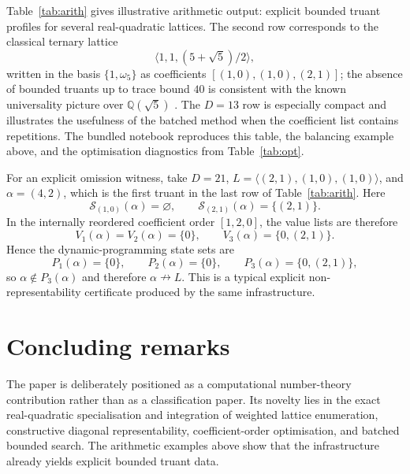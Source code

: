 \documentclass[manuscript]{acmart}
\theoremstyle{plain}
\theoremstyle{definition}
\theoremstyle{nonitalicremark}
\newcommand{\Q}{\mathbb{Q}}
\newcommand{\cS}{\mathcal{S}}
\begin{document}
Table~\ref{tab:arith} gives illustrative arithmetic output: explicit bounded truant
profiles for several real-quadratic lattices. The second row corresponds to the classical ternary
lattice
\[
\langle 1,1,(5+\sqrt5)/2\rangle,
\]
written in the basis $\{1,\omega_5\}$ as coefficients $[(1,0),(1,0),(2,1)]$; the absence of bounded
truants up to trace bound $40$ is consistent with the known universality picture over $\Q(\sqrt5)$
\cite{KalaSurvey}. The \(D=13\) row is especially compact and illustrates the usefulness of the
batched method when the coefficient list contains repetitions. The bundled notebook reproduces this
table, the balancing example above, and the optimisation diagnostics from Table~\ref{tab:opt}.

For an explicit omission witness, take $D=21$, $L=\langle (2,1),(1,0),(1,0)\rangle$, and
$\alpha=(4,2)$, which is the first truant in the last row of Table~\ref{tab:arith}. Here
\[
\cS_{(1,0)}(\alpha)=\varnothing,
\qquad
\cS_{(2,1)}(\alpha)=\{(2,1)\}.
\]
In the internally reordered coefficient order $[1,2,0]$, the value lists are therefore
\[
V_1(\alpha)=V_2(\alpha)=\{0\},
\qquad
V_3(\alpha)=\{0,(2,1)\}.
\]
Hence the dynamic-programming state sets are
\[
P_1(\alpha)=\{0\},
\qquad
P_2(\alpha)=\{0\},
\qquad
P_3(\alpha)=\{0,(2,1)\},
\]
so $\alpha\notin P_3(\alpha)$ and therefore $\alpha\nrightarrow L$. This is a typical explicit
non-representability certificate produced by the same infrastructure.

\section{Concluding remarks}

The paper is deliberately positioned as a computational number-theory contribution rather than as a
classification paper. Its novelty lies in the exact real-quadratic specialisation and integration of
weighted lattice enumeration, constructive diagonal representability, coefficient-order optimisation,
and batched bounded search. The arithmetic examples above show that the infrastructure already yields
explicit bounded truant data.
\end{document}
